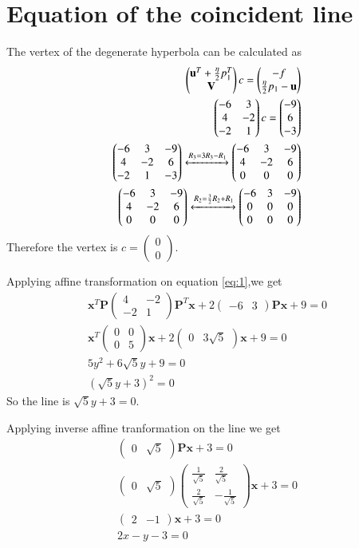 \documentclass[journal,12pt,twocolumn]{IEEEtran}
\providecommand{\brak}[1]{\ensuremath{\left(#1\right)}}
\newcommand{\myvec}[1]{\ensuremath{\begin{pmatrix}#1\end{pmatrix}}}
\numberwithin{equation}{subsection}
\let\vec\mathbf
\begin{document}
\section{Equation of the coincident line}
The vertex of the degenerate hyperbola can be calculated as
\begin{align}
    \myvec{\vec{u}^T+\frac{\eta}{2}p_1^T\\\vec{V}}c=\myvec{-f\\\frac{\eta}{2}p_1-\vec{u}}\\
    \myvec{-6&3\\4&-2\\-2&1}c=\myvec{-9\\6\\-3}\\
    \myvec{-6&3&-9\\4&-2&6\\-2&1&-3}\xleftrightarrow{R_3=3R_3-R_1}\myvec{-6&3&-9\\4&-2&6\\0&0&0}\\
    \myvec{-6&3&-9\\4&-2&6\\0&0&0}\xleftrightarrow{R_2=\frac{3}{2}R_2+R_1}\myvec{-6&3&-9\\0&0&0\\0&0&0}
\end{align}
Therefore the vertex is $c=\myvec{0\\0}$.\par
Applying affine transformation on equation \eqref{eq:1},we get
\begin{align}
    \vec{x}^T\vec{P}\myvec{4&-2\\-2&1}\vec{P}^T\vec{x}+2\myvec{-6&3}\vec{P}\vec{x}+9=0\\
    \vec{x}^T\myvec{0&0\\0&5}\vec{x}+2\myvec{0&3\sqrt{5}}\vec{x}+9=0\\
    5y^2+6\sqrt{5}y+9=0\\
    \brak{\sqrt{5}y+3}^2=0
\end{align}
So the line is $\sqrt{5}y+3=0$.\par
Applying inverse affine tranformation on the line we get
\begin{align}
    \myvec{0&\sqrt{5}}\vec{P}\vec{x}+3=0\\
    \myvec{0&\sqrt{5}}\myvec{\frac{1}{\sqrt{5}}&\frac{2}{\sqrt{5}}\\\frac{2}{\sqrt{5}}&-\frac{1}{\sqrt{5}}}\vec{x}+3=0\\
    \myvec{2&-1}\vec{x}+3=0\\
    2x-y-3=0
\end{align}
\end{document}
